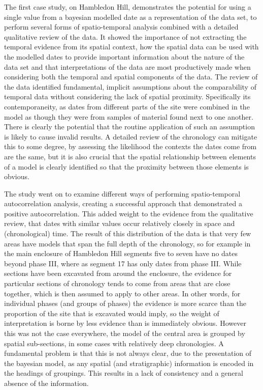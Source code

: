 The first case study, on Hambledon Hill, demonstrates the potential for using a single value from a bayesian modelled date as a representation of the data set, to perform several forms of spatio-temporal analysis combined with a detailed qualitative review of the data. It showed the importance of not extracting the temporal evidence from its spatial context, how the spatial data can be used with the modelled dates to provide important information about the nature of the data set and that interpretations of the data are most productively made when considering both the temporal and spatial components of the data. The review of the data identified fundamental, implicit assumptions about the comparability of temporal data without considering the lack of spatial proximity. Specifically its contemporaneity, as dates from different parts of the site were combined in the model as though they were from samples of material found next to one another. There is clearly the potential that the routine application of such an assumption is likely to cause invalid results. A detailed review of the chronology can mitigate this to some degree, by assessing the likelihood the contexts the dates come from are the same, but it is also crucial that the spatial relationship between elements of a model is clearly identified so that the proximity between those elements is obvious. 

The study went on to examine different ways of performing spatio-temporal autocorrelation analysis, creating a successful approach that demonstrated a positive autocorrelation. This added weight to the evidence from the qualitative review, that dates with similar values occur relatively closely in space and (chronological) time. The result of this distribution of the data is that very few areas have models that span the full depth of the chronology, so for example in the main enclosure of Hambledon Hill segments five to seven have no dates beyond phase III, where as segment 17 has only dates from phase III. While sections have been excavated from around the enclosure, the evidence for particular sections of chronology tends to come from areas that are close together, which is then assumed to apply to other areas. In other words, for individual phases (and groups of phases) the evidence is more scarce than the proportion of the site that is excavated would imply, so the weight of interpretation is borne by less evidence than is immediately obvious. However this was not the case everywhere, the model of the central area is grouped by spatial sub-sections, in some cases with relatively deep chronologies. A fundamental problem is that this is not always clear, due to the presentation of the bayesian model, as any spatial (and stratigraphic) information is encoded in the headings of groupings. This results in a lack of consistency and a general absence of the information. 

